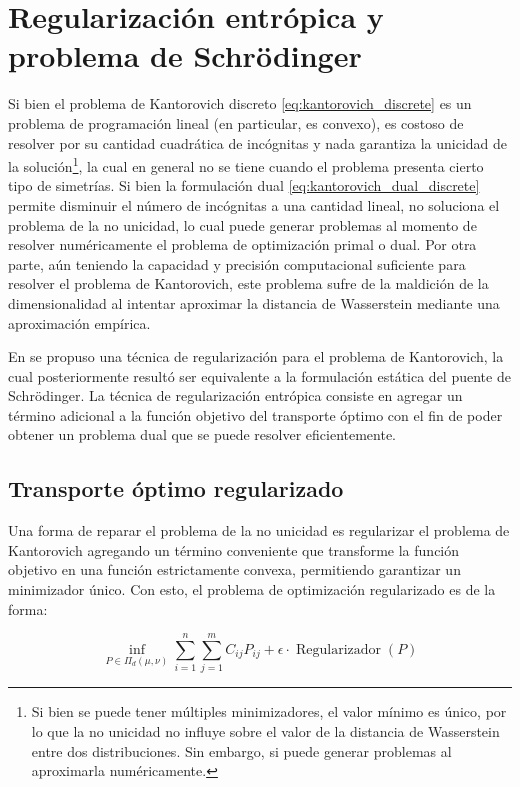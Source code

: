\chapter{Regularización entrópica y problema de Schrödinger}
\label{eot_sbp}

Si bien el problema de Kantorovich discreto \eqref{eq:kantorovich_discrete} es un problema de programación lineal (en particular, es convexo), es costoso de resolver por su cantidad cuadrática de incógnitas y nada garantiza la unicidad de la solución\footnote{Si bien se puede tener múltiples minimizadores, el valor mínimo es único, por lo que la no unicidad no influye sobre el valor de la distancia de Wasserstein entre dos distribuciones. Sin embargo, si puede generar problemas al aproximarla numéricamente.}, la cual en general no se tiene cuando el problema presenta cierto tipo de simetrías. Si bien la formulación dual \eqref{eq:kantorovich_dual_discrete} permite disminuir el número de incógnitas a una cantidad lineal, no soluciona el problema de la no unicidad, lo cual puede generar problemas al momento de resolver numéricamente el problema de optimización primal o dual. Por otra parte, aún teniendo la capacidad y precisión computacional suficiente para resolver el problema de Kantorovich, este problema sufre de la maldición de la dimensionalidad al intentar aproximar la distancia de Wasserstein mediante una aproximación empírica.

En \cite{cuturi2013sinkhorn} se propuso una técnica de regularización para el problema de Kantorovich, la cual posteriormente resultó ser equivalente a la formulación estática del puente de Schrödinger. La técnica de regularización entrópica consiste en agregar un término adicional a la función objetivo del transporte óptimo con el fin de poder obtener un problema dual que se puede resolver eficientemente.

\section{Transporte óptimo regularizado}
\label{eot_sbp/regularized}

Una forma de reparar el problema de la no unicidad es regularizar el problema de Kantorovich agregando un término conveniente que transforme la función objetivo en una función estrictamente convexa, permitiendo garantizar un minimizador único. Con esto, el problema de optimización regularizado es de la forma:

\begin{equation}
	\inf_{P\in \Pi_d(\mu,\nu)} \sum_{i=1}^n \sum_{j=1}^m C_{ij}P_{ij} + \epsilon \cdot\operatorname{Regularizador}(P)
	\label{eq:eot_motivation_discrete}
\end{equation}

